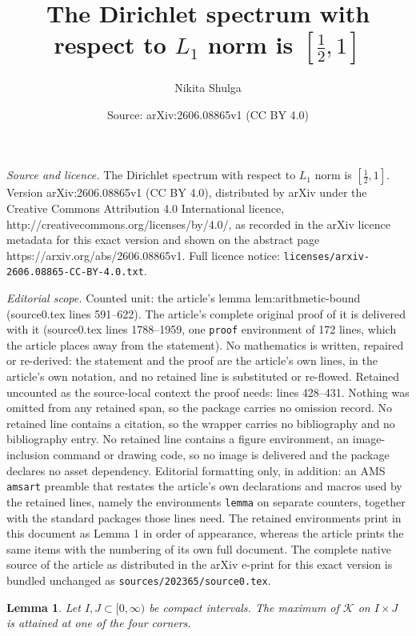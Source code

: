 \documentclass[10pt,a4paper]{amsart}
\title{The Dirichlet spectrum with respect to $L_1$ norm is $\left[\frac12,1\right]$}
\author{Nikita Shulga}
\date{Source: arXiv:2606.08865v1 (CC BY 4.0)}
\newtheorem{lemma}{Lemma}
\newcommand{\Kfun}{\mathcal K}
\begin{document}
\maketitle

\noindent\emph{Source and licence.} The Dirichlet spectrum with respect to $L_1$ norm is $\left[\frac12,1\right]$. Version arXiv:2606.08865v1 (CC BY 4.0), distributed by arXiv under the Creative Commons Attribution 4.0 International licence, http://creativecommons.org/licenses/by/4.0/, as recorded in the arXiv licence metadata for this exact version and shown on the abstract page https://arxiv.org/abs/2606.08865v1. Full licence notice: \texttt{licenses/arxiv-2606.08865-CC-BY-4.0.txt}.\par\smallskip

\noindent\textit{Editorial scope.} Counted unit: the article's lemma lem:arithmetic-bound (source0.tex lines 591--622). The article's complete original proof of it is delivered with it (source0.tex lines 1788--1959, one \texttt{proof} environment of 172 lines, which the article places away from the statement). No mathematics is written, repaired or re-derived: the statement and the proof are the article's own lines, in the article's own notation, and no retained line is substituted or re-flowed.  Retained uncounted as the source-local context the proof needs: lines 428--431.  Nothing was omitted from any retained span, so the package carries no omission record.  No retained line contains a citation, so the wrapper carries no bibliography and no bibliography entry.  No retained line contains a figure environment, an image-inclusion command or drawing code, so no image is delivered and the package declares no asset dependency.  Editorial formatting only, in addition: an AMS \texttt{amsart} preamble that restates the article's own declarations and macros used by the retained lines, namely the environments \texttt{lemma} on separate counters, together with the standard packages those lines need.  The retained environments print in this document as Lemma 1 in order of appearance, whereas the article prints the same items with the numbering of its own full document.  The complete native source of the article as distributed in the arXiv e-print for this exact version is bundled unchanged as \texttt{sources/202365/source0.tex}.
\begin{lemma}\label{lem:endpoint-principle}
Let $I,J\subset[0,\infty)$ be compact intervals.  The maximum of
$\Kfun$ on $I\times J$ is attained at one of the four corners.
\end{lemma}
\end{document}
